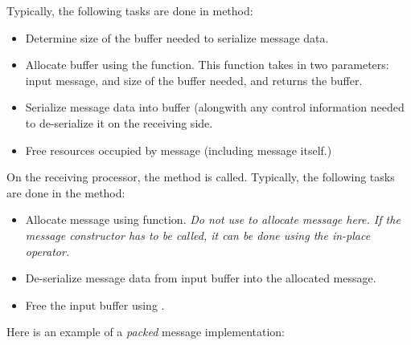 Typically, the following tasks are done in  method:

\begin{itemize}
\item Determine size of the buffer needed to serialize message data.
\item Allocate buffer using the  function. This
function takes in two parameters: input message, and size of the
buffer needed, and returns the buffer.
\item Serialize message data into buffer (alongwith any control
information needed to de-serialize it on the receiving side.
\item Free resources occupied by message (including message itself.)  
\end{itemize}

On the receiving processor, the  method is
called. Typically, the following tasks are done in the 
method:

\begin{itemize}
\item Allocate message using  function. {\em Do not
use  to allocate message here. If the message constructor has
to be called, it can be done using the in-place  operator.}
\item De-serialize message data from input buffer into the allocated message.
\item Free the input buffer using .
\end{itemize}

Here is an example of a {\em packed} message implementation:

